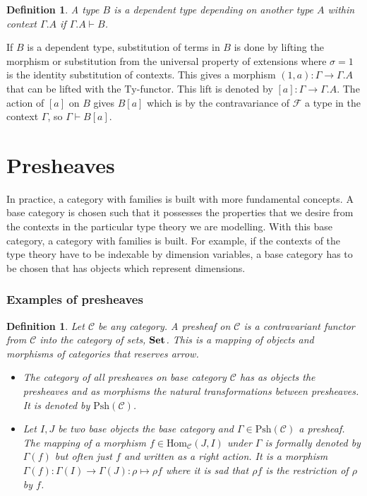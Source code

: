\documentclass[12pt,a4paper,twoside,xetex]{book}
\newcommand{\keyword}[1]{\emph{#1}\index{#1}}
\newtheorem{definition}[theorem]{Definition}
\newcommand{\Psh}[1]{\text{Psh}\left(#1\right)}
\begin{document}
\begin{definition}\label{depmodel}
A type $B$ is a \keyword{dependent type} depending on another type $A$ within 
context $\Gamma.A$ if $\Gamma.A \vdash B$.
\end{definition}

If $B$ is a dependent type, substitution of terms in $B$ is done by lifting the 
morphism or substitution from the universal property of extensions where 
$\sigma = 1$ is the identity substitution of contexts. This gives a morphism 
$\left(1,a\right):\Gamma\rightarrow\Gamma.A$ that can be lifted with the 
$\text{Ty}$-functor. This lift  is denoted by 
$\left[a\right]:\Gamma\rightarrow\Gamma.A$. The action of $\left[a\right]$ on 
$B$ gives $B\left[a\right]$ which is by the contravariance of $\mathcal{F}$ a 
type in the context $\Gamma$, so $\Gamma\vdash B[a]$.



\section{Presheaves}

In practice, a category with families is built with more fundamental concepts. 
A base category is chosen such that it possesses the properties that we desire 
from the contexts in the particular type theory we are modelling. With this 
base category, a category with families is built. For example, if the 
contexts of the type theory have to be indexable by dimension variables, a base 
category has to be chosen that has objects which represent dimensions.

\subsubsection{Examples of presheaves}

\begin{definition}
Let $\mathcal{C}$ be any category. A \keyword{presheaf} on $\mathcal{C}$ is a 
contravariant functor from $\mathcal{C}$ into the category of sets, $\text{\textbf{Set}}$. 
This is a mapping of objects and morphisms of categories that reserves arrow. 

\begin{itemize}
\item The category of all presheaves on base category $\mathcal{C}$ has as 
objects the presheaves and as morphisms the natural transformations between 
presheaves. It is denoted by $\Psh{\mathcal{C}}$.

\item Let $I,J$ be two base objects the base category and $\Gamma \in 
\Psh{\mathcal{C}}$ a presheaf. 
The mapping of a morphism $f \in \text{Hom}_{\mathcal{C}} (J,I)$ under $\Gamma$ 
is formally denoted by $\Gamma (f)$ but often just $f$ and written as a right 
action. 
It is a morphism $\Gamma (f) : \Gamma(I) \rightarrow \Gamma (J):\rho \mapsto 
\rho f$ where it is sad that $\rho f$ is the \keyword{restriction} of $\rho$ by 
$f$.

\end{itemize}
\end{definition}
\end{document}
